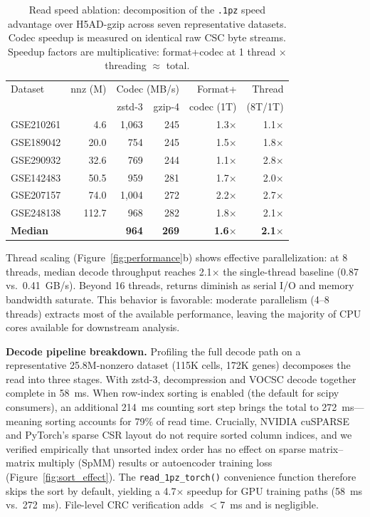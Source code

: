 \documentclass[10pt,twocolumn,letterpaper]{article}
\begin{document}
\begin{table}[t]
\centering
\small
\caption{Read speed ablation: decomposition of the \texttt{.1pz} speed advantage over H5AD-gzip across seven representative datasets. Codec speedup is measured on identical raw CSC byte streams. Speedup factors are multiplicative: format+codec at 1 thread $\times$ threading $\approx$ total.}
\label{tab:ablation}
\begin{tabular}{lrrrrr}
\toprule
Dataset & nnz (M) & \multicolumn{2}{c}{Codec (MB/s)} & Format+ & Thread \\
 & & zstd-3 & gzip-4 & codec (1T) & (8T/1T) \\
\midrule
GSE210261 &   4.6 & 1{,}063 & 245 & 1.3$\times$ & 1.1$\times$ \\
GSE189042 &  20.0 &    754 & 245 & 1.5$\times$ & 1.8$\times$ \\
GSE290932 &  32.6 &    769 & 244 & 1.1$\times$ & 2.8$\times$ \\
GSE142483 &  50.5 &    959 & 281 & 1.7$\times$ & 2.0$\times$ \\
GSE207157 &  74.0 & 1{,}004 & 272 & 2.2$\times$ & 2.7$\times$ \\
GSE248138 & 112.7 &    968 & 282 & 1.8$\times$ & 2.1$\times$ \\
\midrule
\textbf{Median} & & \textbf{964} & \textbf{269} & \textbf{1.6}$\times$ & \textbf{2.1}$\times$ \\
\bottomrule
\end{tabular}
\end{table}

Thread scaling (Figure~\ref{fig:performance}b) shows effective parallelization: at 8 threads, median decode throughput reaches 2.1$\times$ the single-thread baseline (0.87 vs.\ 0.41~GB/s).
Beyond 16 threads, returns diminish as serial I/O and memory bandwidth saturate.
This behavior is favorable: moderate parallelism (4--8 threads) extracts most of the available performance, leaving the majority of CPU cores available for downstream analysis.

\textbf{Decode pipeline breakdown.}\label{sec:decode_pipeline}
Profiling the full decode path on a representative 25.8M-nonzero dataset (115K cells, 172K genes) decomposes the read into three stages.
With zstd-3, decompression and VOCSC decode together complete in 58~ms.
When row-index sorting is enabled (the default for scipy consumers), an additional 214~ms counting sort step brings the total to 272~ms---meaning sorting accounts for 79\% of read time.
Crucially, NVIDIA cuSPARSE~\cite{nvidia_cusparse} and PyTorch's sparse CSR layout do not require sorted column indices, and we verified empirically that unsorted index order has no effect on sparse matrix--matrix multiply (SpMM) results or autoencoder training loss (Figure~\ref{fig:sort_effect}).
The \texttt{read\_1pz\_torch()} convenience function therefore skips the sort by default, yielding a 4.7$\times$ speedup for GPU training paths (58~ms vs.\ 272~ms).
File-level CRC verification adds $<$7~ms and is negligible.
\end{document}
